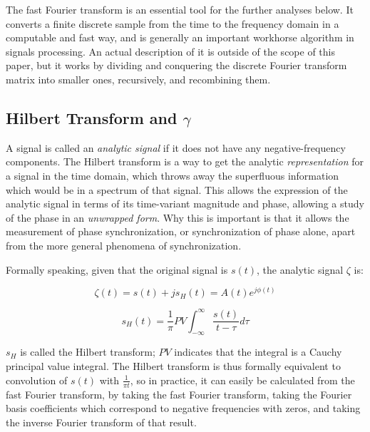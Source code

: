 \documentclass[12pt]{article}
\begin{document}
The fast Fourier transform\cite{fft} is an essential tool for the further analyses below. It converts a finite discrete sample from the time to the frequency domain in a computable and fast way, and is generally an important workhorse algorithm in signals processing. An actual description of it is outside of the scope of this paper, but it works by dividing and conquering the discrete Fourier transform matrix into smaller ones, recursively, and recombining them.

\subsection{Hilbert Transform and $\gamma$}


A signal is called an \emph{analytic signal} if it does not have any negative-frequency components. The Hilbert transform is a way to get the analytic \emph{representation} for a signal in the time domain, which throws away the superfluous information which would be in a spectrum of that signal. This allows the expression of the analytic signal in terms of its time-variant magnitude and phase, allowing a study of the phase in an \emph{unwrapped form}\cite{gabor}. Why this is important is that it allows the measurement of phase synchronization, or synchronization of phase alone, apart from the more general phenomena of synchronization.

Formally speaking, given that the original signal is $s(t)$, the analytic signal $\zeta$ is:

$$\zeta(t) = s(t) + js_H(t) = A(t)e^{j\phi(t)}$$

$$s_H(t) = \frac{1}{\pi} PV \int_{-\infty}^{\infty} \frac{s(t)}{t - \tau} d\tau$$

$s_H$ is called the Hilbert transform; $PV$ indicates that the integral is a Cauchy principal value integral. The Hilbert transform is thus formally equivalent to convolution of $s(t)$ with $\frac{1}{\pi t}$, so in practice, it can easily be calculated from the fast Fourier transform, by taking the fast Fourier transform, taking the Fourier basis coefficients which correspond to negative frequencies with zeros, and taking the inverse Fourier transform of that result.\cite{hilbert}
\end{document}
